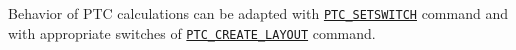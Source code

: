 Behavior of PTC calculations can be adapted with
\hyperref[sec:ptc-setswitch]{\texttt{PTC\_SETSWITCH}} command 
and with appropriate switches of
\hyperref[sec:ptc-create-layout]{\texttt{PTC\_CREATE\_LAYOUT}} command.  









